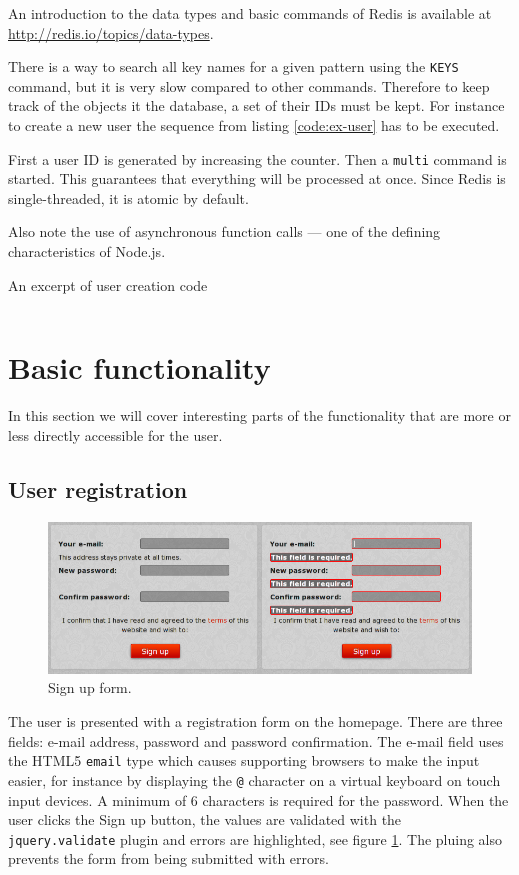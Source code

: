 \documentclass[12pt,oneside]{fithesis}
\begin{document}
	
	An introduction to the data types and basic commands of Redis is available at \url{http://redis.io/topics/data-types}.
	
	There is a way to search all key names for a given pattern using the \texttt{KEYS} command, but it is very slow compared to other commands. Therefore to keep track of the objects it the database, a set of their IDs must be kept. For instance to create a new user the sequence from listing \ref{code:ex-user} has to be executed.
	
	First a user ID is generated by increasing the counter. Then a \texttt{multi} command is started. This guarantees that everything will be processed at once. Since Redis is single-threaded, it is atomic by default.
	
	Also note the use of asynchronous function calls --- one of the defining characteristics of Node.js.
	\begin{program}[h!]
	\caption{An excerpt of user creation code}
	\label{code:ex-user}
	\inputminted[fontsize=\footnotesize, linenos=false]{javascript}{ex-user.js}
	\end{program}
	
	
\section{Basic functionality}
	In this section we will cover interesting parts of the functionality that are more or less directly accessible for the user.
	\subsection{User registration}	
	  \begin{figure}[h]
	  \centering
	    \includegraphics[width=1.0\textwidth]{screen-signup.png}
		  \caption{Sign up form.}
		  \label{fig:screen-signup}
	  \end{figure}
		The user is presented with a registration form on the homepage. There are three fields: e-mail address, password and password confirmation. The e-mail field uses the HTML5 \texttt{email} type which causes supporting browsers to make the input easier, for instance by displaying the \texttt{@} character on a virtual keyboard on touch input devices. A minimum of 6 characters is required for the password. When the user clicks the Sign up button, the values are validated with the \texttt{jquery.validate} plugin and errors are highlighted, see figure \ref{fig:screen-signup}. The pluing also prevents the form from being submitted with errors.
		
\end{document}
